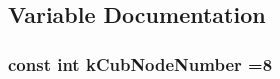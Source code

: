 \subsection{Variable Documentation}
\subsubsection[{\texorpdfstring{k\+Cub\+Node\+Number}{kCubNodeNumber}}]{\setlength{\rightskip}{0pt plus 5cm}const int k\+Cub\+Node\+Number =8}\hypertarget{cuboid_8hh_a307d3738f6f190cdcd0c4f90bd458fe9}{}\label{cuboid_8hh_a307d3738f6f190cdcd0c4f90bd458fe9}
